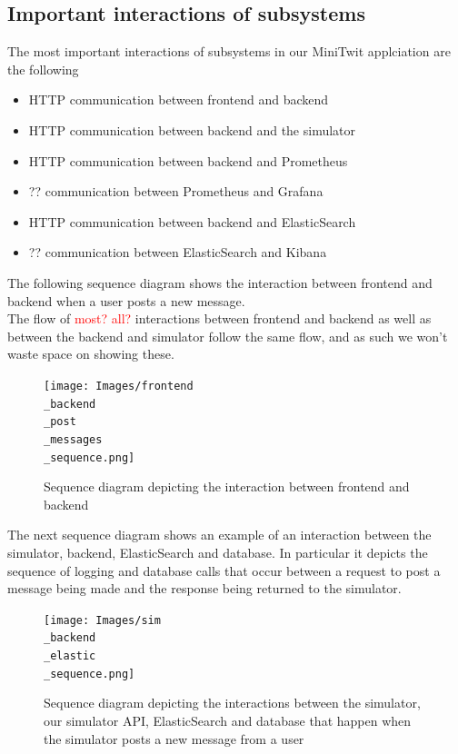 \subsection{Important interactions of subsystems}
The most important interactions of subsystems in our MiniTwit applciation are the following 
\begin{itemize}
    \item HTTP communication between frontend and backend
    \item HTTP communication between backend and the simulator
    \item HTTP communication between backend and Prometheus
    \item ?? communication between Prometheus and Grafana
    \item HTTP communication between backend and ElasticSearch
    \item ?? communication between ElasticSearch and Kibana
\end{itemize}

The following sequence diagram shows the interaction between frontend and backend when a user posts a new message. \\
The flow of \textcolor{red}{most? all?} interactions between frontend and backend as well as between the backend and simulator follow the same flow, and as such we won't waste space on showing these. 

\begin{figure}[H]
 \centering
 \texttt{[image: Images/frontend\\\_backend\\\_post\\\_messages\\\_sequence.png]}
 \caption{Sequence diagram depicting the interaction between frontend and backend}
 \label{fig:SequenceDiagramPostMessage}
\end{figure}

The next sequence diagram shows an example of an interaction between the simulator, backend, ElasticSearch and database. In particular it depicts the sequence of logging and database calls that occur between a request to post a message being made and the response being returned to the simulator.

\begin{figure}[H]
 \centering
 \texttt{[image: Images/sim\\\_backend\\\_elastic\\\_sequence.png]}
 \caption{Sequence diagram depicting the interactions between the simulator, our simulator API, ElasticSearch and database that happen when the simulator posts a new message from a user}
 \label{fig:SequenceDiagramElasticBackendSim}
\end{figure}


